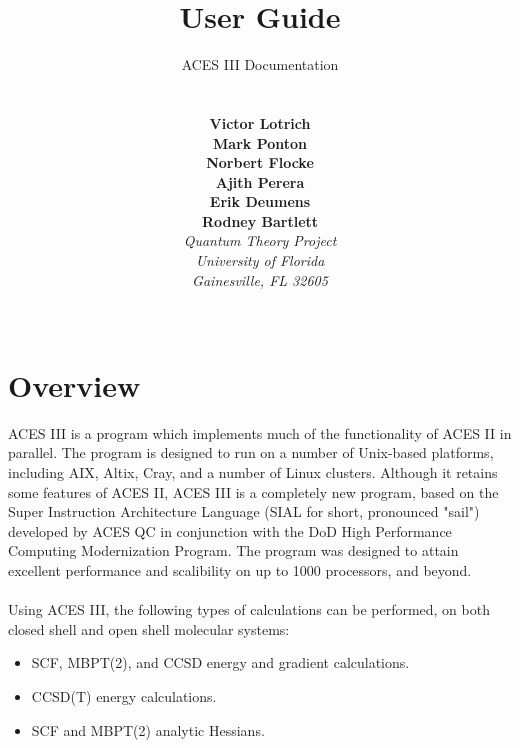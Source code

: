 \documentclass[12pt]{article}
\begin{document}
\title{User Guide}


\author{
  ACES III Documentation \\
  \\
  \\
  {\bf Victor Lotrich} \\
  {\bf Mark Ponton} \\
  {\bf Norbert Flocke} \\
  {\bf Ajith Perera} \\
  {\bf Erik Deumens} \\
  {\bf Rodney Bartlett} \\
{\em Quantum Theory Project} \\
{\em University of Florida} \\
{\em Gainesville, FL 32605} \\
\\
}
\maketitle

\newpage

\section{\bf Overview} 

ACES III is a program which implements much of the functionality of ACES II in parallel.  
The program is designed to run on a number of Unix-based platforms, including AIX, 
Altix, Cray, and a number of Linux clusters. Although it retains some features of 
ACES II, ACES III is a completely new program, based on the Super Instruction 
Architecture Language (SIAL for short, pronounced "sail") developed by ACES QC in 
conjunction with the DoD High Performance Computing Modernization Program. The program was 
designed to attain excellent performance and scalibility on up to 1000 processors, and
beyond.\\  
\\
Using ACES III, the following types of calculations can be performed, on both closed 
shell and open shell molecular systems:

\begin{itemize} 

 \item SCF, MBPT(2), and CCSD energy and gradient calculations.
 \item CCSD(T) energy calculations.
 \item SCF and MBPT(2) analytic Hessians.

\end{itemize} 
\end{document}
